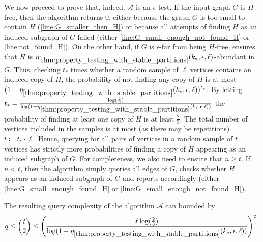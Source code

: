         We now proceed to prove that, indeed, $\mathcal{A}$ is an $\epsilon$-test.
        If the input graph $G$ is $H$-free, then the algorithm returns $0$, either because the graph $G$ is too small to
        contain $H$ (\cref{line:G_smaller_then_H}) or because all attempts of finding $H$ as an induced subgraph of $G$
        failed (either \cref{line:G_small_enough_not_found_H} or \cref{line:not_found_H}).
        On the other hand, if $G$ is $\epsilon$-far from being $H$-free, 
        ensures that $H$ is $\eta_{\ref{thm:property_testing_with_stable_partitions}}(k_*, \epsilon, \ell)$-abundant in $G$.
        Thus, checking $t_*$ times whether a random sample of $\ell$ vertices contains an
        induced copy of $H$, the probability of not finding any copy of $H$ is at most
        $( 1 - \eta_{\ref{thm:property_testing_with_stable_partitions}}(k_*, \epsilon, \ell) )^{t_*}$.
        By letting $t_* = \frac{\log( \frac{2}{3} )}
            {\log( 1 - \eta_{\ref{thm:property_testing_with_stable_partitions}}(k_*, \epsilon, \ell) )}$
        the probability of finding at least one copy of $H$ is at least $\frac{2}{3}$.
        The total number of vertices included in the samples is at most (as there may be repetitions) $t \coloneqq t_* \cdot \ell$.
        Hence, querying for all pairs of vertices in a random sample of $t$ vertices has strictly more probabilities of
        finding a copy of $H$ appearing as an induced subgraph of $G$.
        For completeness, we also need to ensure that $n \geq t$.
        If $n < t$, then the algorithm simply queries all edges of $G$, checks whether $H$ appears as an induced subgraph
        of $G$ and reports accordingly (either \cref{line:G_small_enough_found_H} or \cref{line:G_small_enough_not_found_H}).

        The resulting query complexity of the algorithm $\mathcal{A}$ can bounded by
        \[
            q \leq {t \choose 2}
              \leq \left(  \frac{\ell \log( \frac{2}{3} )}
                   {\log( 1 - \eta_{\ref{thm:property_testing_with_stable_partitions}}(k_*, \epsilon, \ell) )} \right)^2.
        \]

